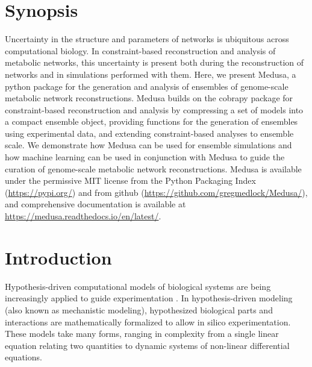 \documentclass[11pt,twocolumn,notitlepage,openany,twoside]{book}
\begin{document}
\begin{refsection}
\section{Synopsis}

Uncertainty in the structure and parameters of networks is ubiquitous across computational biology. In constraint-based reconstruction and analysis of metabolic networks, this uncertainty is present both during the reconstruction of networks and in simulations performed with them. Here, we present Medusa, a python package for the generation and analysis of ensembles of genome-scale metabolic network reconstructions. Medusa builds on the cobrapy package for constraint-based reconstruction and analysis by compressing a set of models into a compact ensemble object, providing functions for the generation of ensembles using experimental data, and extending constraint-based analyses to ensemble scale. We demonstrate how Medusa can be used for ensemble simulations and how machine learning can be used in conjunction with Medusa to guide the curation of genome-scale metabolic network reconstructions. Medusa is available under the permissive MIT license from the Python Packaging Index (\url{https://pypi.org/}) and from github (\url{https://github.com/gregmedlock/Medusa/}), and comprehensive documentation is available at \url{https://medusa.readthedocs.io/en/latest/}.

\section{Introduction}

Hypothesis-driven computational models of biological systems are being increasingly applied to guide experimentation \cite{Kitano2002-az}. In hypothesis-driven modeling (also known as mechanistic modeling), hypothesized biological parts and interactions are mathematically formalized to allow in silico experimentation. These models take many forms, ranging in complexity from a single linear equation relating two quantities to dynamic systems of non-linear differential equations.


\end{refsection}
\end{document}
